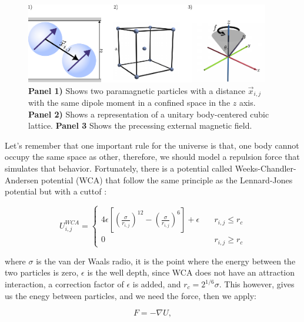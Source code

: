 \begin{figure}[H]
  \begin{center}
    \includegraphics[width=0.95\textwidth]{figures/methods1.pdf}
  \end{center}
  \caption{\textbf{Panel 1)} Shows two paramagnetic particles with a distance \(\vec{x}_{i,j}\) with the same dipole moment in a confined space in the \( z\) axis. \textbf{Panel 2)} Shows a representation of a  unitary body-centered cubic lattice. \textbf{Panel 3} Shows the precessing external magnetic field.}\label{fig:facecenteredlattice}
\end{figure}

Let's remember that one important rule for the universe is that, one body cannot occupy the same space as other, therefore, we should model a repulsion force that simulates that behavior. Fortunately, there is a potential called Weeks-Chandler-Andersen potential (WCA) that follow the same principle as the Lennard-Jones potential but with a cuttof \cite{hess1999augmented}:

\begin{equation}
  U_{i,j}^{WCA} = \begin{cases} 
    4\epsilon\left[ \left( \frac{\sigma}{r_{i,j}}\right)^{12} - \left( \frac{\sigma}{r_{i,j}}\right)^6\right] + \epsilon \quad &r_{i,j} \leq r_c \\
    0 \quad & r_{i,j} \geq r_c
  \end{cases}
  \label{eq:wcapotential}
\end{equation}

where $\sigma$ is the van der Waals radio, it is the point where the energy between the two particles is zero, $\epsilon$ is the well depth, since WCA does not have an attraction interaction, a correction factor of $\epsilon$ is added, and $r_c = 2^{1/6}\sigma$. This however, gives us the enegy between particles, and we need the force, then we apply:

\begin{equation}
 F = - \nabla U, 
  \label{eq:negativegradient}
\end{equation}

